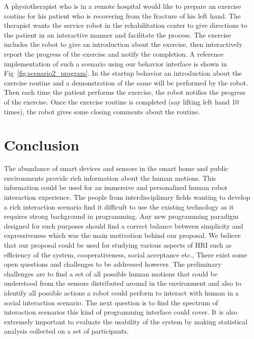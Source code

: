 \documentclass{llncs}
\begin{document}
A physiotherapist who is in a remote hospital would like to prepare an exercise routine for his patient who is recovering from the fracture of his left hand. The therapist wants the service robot in the rehabilitation center to give directions to the patient in an interactive manner and facilitate the process. The exercise includes the robot to give an introduction about the exercise, then interactively report the progress of the exercise and notify the completion. A reference implementation of such a scenario using our behavior interface is shown in Fig~\ref{fig:scenario2_program}. In the startup behavior an introduction about the exercise routine and a demonstration of the same will be performed by the robot. Then each time the patient performs the exercise, the robot notifies the progress of the exercise. Once the exercise routine is completed (say lifting left hand 10 times), the robot gives some closing comments about the routine.
\section{Conclusion}
The abundance of smart devices and sensors in the smart home and public environments provide rich information about the human motions. This information could be used for an immersive and personalized human robot interaction experience. The people from interdisciplinary fields wanting to develop a rich interaction scenario find it difficult to use the existing technology as it requires strong background in programming. Any new programming paradigm designed for such purposes should find a correct balance between simplicity and expressiveness which was the main motivation behind our proposal. We believe that our proposal could be used for studying various aspects of HRI such as efficiency of the system, cooperativeness, social acceptance etc., There exist some open questions and challenges to be addressed however. The preliminary challenges are to find a set of all possible human motions that could be understood from the sensors distributed around in the environment and also to identify all possible actions a robot could perform to interact with human in a social interaction scenario. The next question is to find the spectrum of interaction scenarios this kind of programming interface could cover. It is also extremely important to evaluate the usability of the system by making statistical analysis collected on a set of participants.
\end{document}

